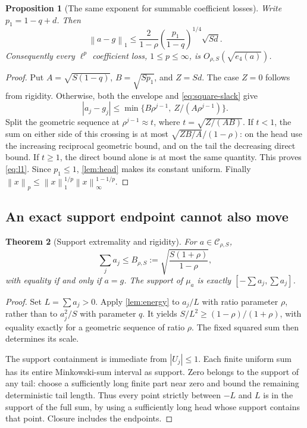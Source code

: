 \documentclass[11pt,a4paper]{article}
\numberwithin{equation}{section}
\newtheorem{theorem}{Theorem}[section]
\newtheorem{proposition}[theorem]{Proposition}
\theoremstyle{definition}
\theoremstyle{remark}
\newcommand{\C}{\mathcal C}
\newcommand{\norm}[1]{\left\lVert #1\right\rVert}
\begin{document}
\begin{proposition}[The same exponent for summable coefficient losses]
\label{prop:l1}
Write $p_1=1-q+d$. Then
\begin{equation}
 \norm{a-g}_1\le
 \frac{2}{1-\rho}
 \left(\frac{p_1}{1-q}\right)^{1/4}\sqrt{Sd}.
 \label{eq:l1}
\end{equation}
Consequently every $\ell^p$ coefficient loss, $1\le p\le\infty$, is
$O_{\rho,S}(\sqrt{e_4(a)})$.
\end{proposition}
\begin{proof}
Put $A=\sqrt{S(1-q)}$, $B=\sqrt{Sp_1}$, and $Z=Sd$.
The case $Z=0$ follows from rigidity. Otherwise, both the envelope and
\eqref{eq:square-slack} give
\[
 |a_j-g_j|\le\min\{B\rho^{j-1},\ Z/(A\rho^{j-1})\}.
\]
Split the geometric sequence at $\rho^{j-1}\approx t$, where
$t=\sqrt{Z/(AB)}$. If $t<1$, the sum on either side of this crossing is
at most $\sqrt{ZB/A}/(1-\rho)$: on the head use the increasing reciprocal
geometric bound, and on the tail the decreasing direct bound. If $t\ge1$,
the direct bound alone is at most the same quantity. This proves
\eqref{eq:l1}. Since $p_1\le1$, \cref{lem:head} makes its constant uniform.
Finally $\norm{x}_p\le\norm{x}_1^{1/p}\norm{x}_\infty^{1-1/p}$.
\end{proof}

\subsection{An exact support endpoint cannot also move}

\begin{theorem}[Support extremality and rigidity]
\label{thm:support}
For $a\in\C_{\rho,S}$,
\begin{equation}
 \sum_ja_j\le B_{\rho,S}:=
 \sqrt{\frac{S(1+\rho)}{1-\rho}},
 \label{eq:support-bound}
\end{equation}
with equality if and only if $a=g$. The support of $\mu_a$ is exactly
$[-\sum a_j,\sum a_j]$.
\end{theorem}
\begin{proof}
Set $L=\sum a_j>0$. Apply \cref{lem:energy} to $a_j/L$ with ratio
parameter $\rho$, rather than to $a_j^2/S$ with parameter $q$.
It yields
$S/L^2\ge(1-\rho)/(1+\rho)$, with equality exactly for a geometric
sequence of ratio $\rho$. The fixed squared sum then determines its scale.

The support containment is immediate from $|U_j|\le1$. Each finite uniform
sum has its entire Minkowski-sum interval as support. Zero belongs to the
support of any tail: choose a sufficiently long finite part near zero and
bound the remaining deterministic tail length. Thus every point strictly
between $-L$ and $L$ is in the support of the full sum, by using a sufficiently
long head whose support contains that point. Closure includes the endpoints.
\end{proof}
\end{document}
